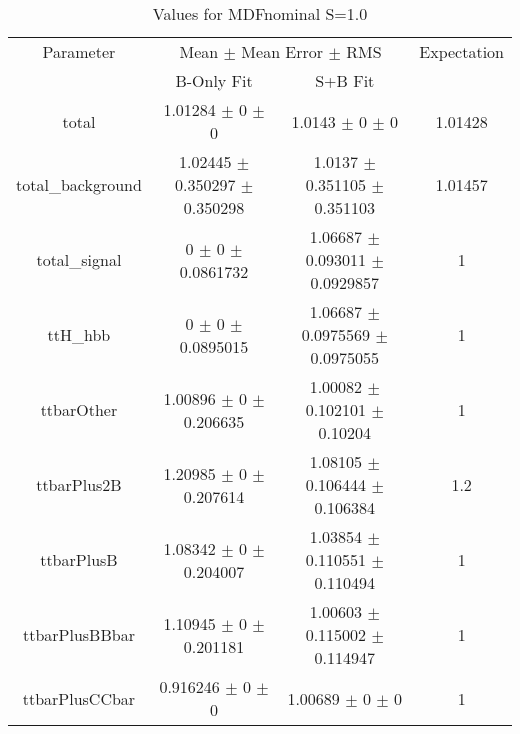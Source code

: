 \begin{table}
\centering
\caption{Values for MDFnominal S=1.0}
\begin{tabular}{cccc}
\toprule
Parameter & \multicolumn{2}{c}{Mean $\pm$ Mean Error $\pm$ RMS} & Expectation\\
 & B-Only Fit & S+B Fit & \\
\midrule
total & \num{1.01284} $\pm$ \num{0} $\pm$ \num{0} & \num{1.0143} $\pm$ \num{0} $\pm$ \num{0} & \num{1.01428}\\
total\_background & \num{1.02445} $\pm$ \num{0.350297} $\pm$ \num{0.350298} & \num{1.0137} $\pm$ \num{0.351105} $\pm$ \num{0.351103} & \num{1.01457}\\
total\_signal & \num{0} $\pm$ \num{0} $\pm$ \num{0.0861732} & \num{1.06687} $\pm$ \num{0.093011} $\pm$ \num{0.0929857} & \num{1}\\
ttH\_hbb & \num{0} $\pm$ \num{0} $\pm$ \num{0.0895015} & \num{1.06687} $\pm$ \num{0.0975569} $\pm$ \num{0.0975055} & \num{1}\\
ttbarOther & \num{1.00896} $\pm$ \num{0} $\pm$ \num{0.206635} & \num{1.00082} $\pm$ \num{0.102101} $\pm$ \num{0.10204} & \num{1}\\
ttbarPlus2B & \num{1.20985} $\pm$ \num{0} $\pm$ \num{0.207614} & \num{1.08105} $\pm$ \num{0.106444} $\pm$ \num{0.106384} & \num{1.2}\\
ttbarPlusB & \num{1.08342} $\pm$ \num{0} $\pm$ \num{0.204007} & \num{1.03854} $\pm$ \num{0.110551} $\pm$ \num{0.110494} & \num{1}\\
ttbarPlusBBbar & \num{1.10945} $\pm$ \num{0} $\pm$ \num{0.201181} & \num{1.00603} $\pm$ \num{0.115002} $\pm$ \num{0.114947} & \num{1}\\
ttbarPlusCCbar & \num{0.916246} $\pm$ \num{0} $\pm$ \num{0} & \num{1.00689} $\pm$ \num{0} $\pm$ \num{0} & \num{1}\\
\bottomrule
\end{tabular}
\end{table}